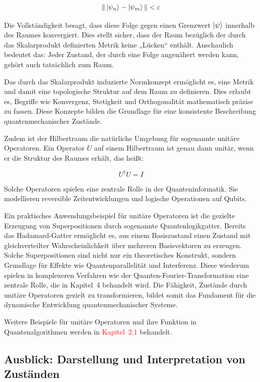 \[
\| \ket{\psi_n}  - \ket{\psi_m}  \| < \varepsilon
\]

Die Vollständigkeit besagt, dass diese Folge gegen einen Grenzwert \( \ket{\psi} \) innerhalb des Raumes konvergiert. Dies stellt sicher, dass der Raum bezüglich der durch das Skalarprodukt definierten Metrik keine „Lücken“ enthält. Anschaulich bedeutet das: Jeder Zustand, der durch eine Folge angenähert werden kann, gehört auch tatsächlich zum Raum.

Das durch das Skalarprodukt induzierte Normkonzept ermöglicht es, eine Metrik und damit eine topologische Struktur auf dem Raum zu definieren. Dies erlaubt es, Begriffe wie Konvergenz, Stetigkeit und Orthogonalität mathematisch präzise zu fassen. Diese Konzepte bilden die Grundlage für eine konsistente Beschreibung quantenmechanischer Zustände.

Zudem ist der Hilbertraum die natürliche Umgebung für sogenannte unitäre Operatoren. Ein Operator \( U \) auf einem Hilbertraum ist genau dann unitär, wenn er die Struktur des Raumes erhält, das heißt:

\[
U^\dagger U = I
\]

Solche Operatoren spielen eine zentrale Rolle in der Quanteninformatik. Sie modellieren reversible Zeitentwicklungen und logische Operationen auf Qubits.

Ein praktisches Anwendungsbeispiel für unitäre Operatoren ist die gezielte Erzeugung von Superpositionen durch sogenannte Quantenlogikgatter. Bereits das Hadamard-Gatter ermöglicht es, aus einem Basiszustand einen Zustand mit gleichverteilter Wahrscheinlichkeit über mehreren Basisvektoren zu erzeugen. Solche Superpositionen sind nicht nur ein theoretisches Konstrukt, sondern Grundlage für Effekte wie Quantenparallelität und Interferenz. Diese wiederum spielen in komplexeren Verfahren wie der Quanten-Fourier-Transformation eine zentrale Rolle, die in Kapitel~4 behandelt wird. Die Fähigkeit, Zustände durch unitäre Operatoren gezielt zu transformieren, bildet somit das Fundament für die dynamische Entwicklung quantenmechanischer Systeme.

Weitere Beispiele für unitäre Operatoren und ihre Funktion in Quantenalgorithmen werden in  \textcolor{red}{Kapitel~2.1} behandelt.

\subsection{Ausblick: Darstellung und Interpretation von Zuständen}

